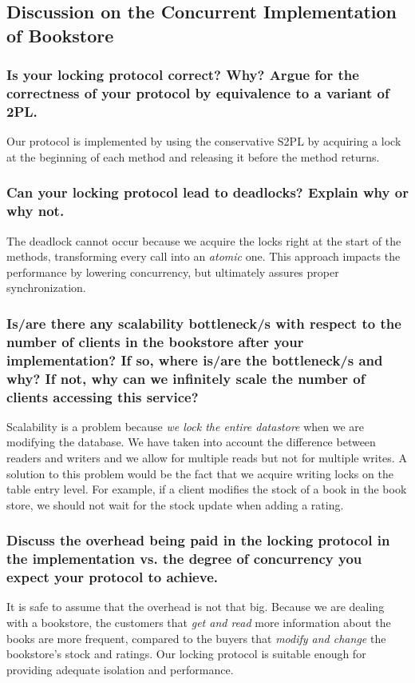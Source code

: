 \documentclass{article}      %
\begin{document}
\subsection*{Discussion on the Concurrent Implementation of Bookstore}

\subsubsection*{Is your locking protocol correct? Why? Argue for the correctness of your protocol by equivalence to a variant of 2PL.}

Our protocol is implemented by using the conservative S2PL by acquiring a lock at the beginning of each method and releasing it before the method returns.\\

\subsubsection*{Can your locking protocol lead to deadlocks? Explain why or why not.}

The deadlock cannot occur because we acquire the locks right at the start of the methods, transforming every call into an \emph{atomic} one. This approach impacts the performance by lowering concurrency, but ultimately assures proper synchronization.\\

\subsubsection*{Is/are there any scalability bottleneck/s with respect to the number of clients in the bookstore after your implementation? If so, where is/are the bottleneck/s and why? If not, why can we infinitely scale the number of clients accessing this service?}

Scalability is a problem because \emph{we lock the entire datastore} when we are modifying the database. We have taken into account the difference between readers and writers and we allow for multiple reads but not for multiple writes. A solution to this problem would be the fact that we acquire writing locks on the table entry level. For example, if a client modifies the stock of a book in the book store, we should not wait for the stock update when adding a rating.\\

\subsubsection*{Discuss the overhead being paid in the locking protocol in the implementation vs. the degree of concurrency you expect your protocol to achieve.}

It is safe to assume that the overhead is not that big. Because we are dealing with a bookstore, the customers that \emph{get and read}  more information about the books are more frequent, compared to the buyers that \emph{modify and change} the bookstore's stock and ratings. Our locking protocol is suitable enough for providing adequate isolation and performance.

\newpage
\end{document}
